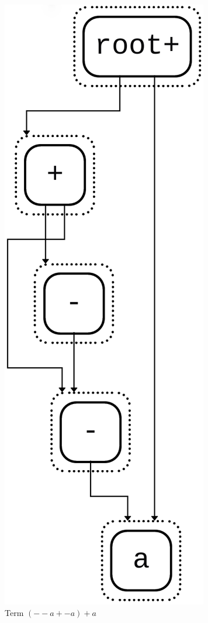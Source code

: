 \begin{figure}[h]
	\centering
	\begin{subfigure}[t]{0.23\textwidth}
		\centering
		\includegraphics[width=1.4\linewidth,height=1.4\linewidth,keepaspectratio=true]{img/e_graph1.png}
		\caption{\scriptsize Term $(--a + -a) + a$}
		\label{fig:e-graph-sub1}
	\end{subfigure}
	\hfill
	\begin{subfigure}[t]{0.27\textwidth}
		\centering

\end{subfigure}
\end{figure}
